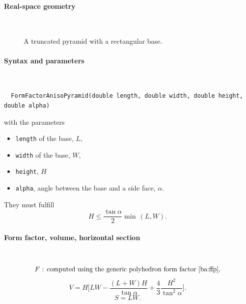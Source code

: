 \paragraph{Real-space geometry}\strut\\

\begin{figure}[H]
\hfill
{}
\hfill
{}
\hfill
{}
\hfill
\caption{A truncated pyramid with a rectangular base.}
\end{figure}

\FloatBarrier

\paragraph{Syntax and parameters}\strut\\[-2ex plus .2ex minus .2ex]
\begin{lstlisting}
  FormFactorAnisoPyramid(double length, double width, double height, double alpha)
\end{lstlisting}
with the parameters
\begin{itemize}
\item \texttt{length} of the base, $L$,
\item \texttt{width} of the base, $W$,
\item \texttt{height}, $H$
\item \texttt{alpha}, angle between the base and a side face, $\alpha$.
\end{itemize}
They must fulfill
\begin{displaymath}
  H \le \frac{\tan\alpha}{2} \min\,(L,W).
\end{displaymath}

\paragraph{Form factor, volume, horizontal section}\strut\\
\begin{equation*}
  F \text{~: computed using the generic polyhedron form factor~\cite{ba:ffp},}
\end{equation*}
\begin{equation*}
  V= H \Big[LW - \dfrac{(L + W)H}{\tan\alpha} + \dfrac{4}{3} \dfrac{H^2}{\tan^2\alpha}\Big].
\end{equation*}
\begin{equation*}
  S=LW.
\end{equation*}

